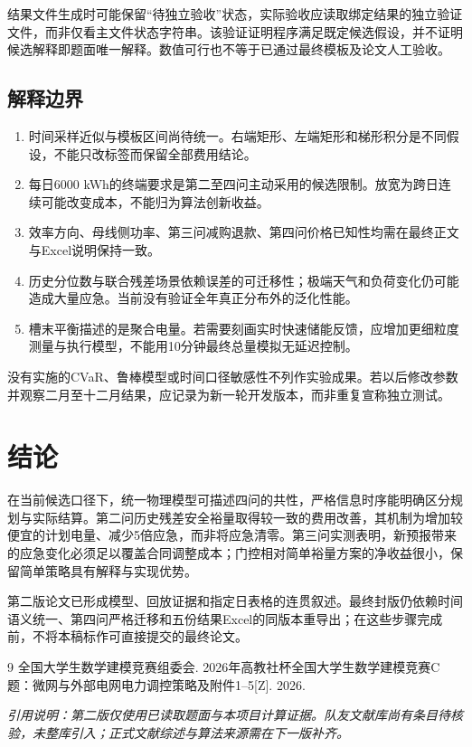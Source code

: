 \documentclass[UTF8,a4paper,zihao=-4,fontset=fandol]{ctexart}
\begin{document}
结果文件生成时可能保留“待独立验收”状态，实际验收应读取绑定结果的独立验证文件，而非仅看主文件状态字符串。该验证证明程序满足既定候选假设，并不证明候选解释即题面唯一解释。数值可行也不等于已通过最终模板及论文人工验收。

\subsection{解释边界}
\begin{enumerate}
\item 时间采样近似与模板区间尚待统一。右端矩形、左端矩形和梯形积分是不同假设，不能只改标签而保留全部费用结论。
\item 每日6000 kWh的终端要求是第二至四问主动采用的候选限制。放宽为跨日连续可能改变成本，不能归为算法创新收益。
\item 效率方向、母线侧功率、第三问减购退款、第四问价格已知性均需在最终正文与Excel说明保持一致。
\item 历史分位数与联合残差场景依赖误差的可迁移性；极端天气和负荷变化仍可能造成大量应急。当前没有验证全年真正分布外的泛化性能。
\item 槽末平衡描述的是聚合电量。若需要刻画实时快速储能反馈，应增加更细粒度测量与执行模型，不能用10分钟最终总量模拟无延迟控制。
\end{enumerate}
没有实施的CVaR、鲁棒模型或时间口径敏感性不列作实验成果。若以后修改参数并观察二月至十二月结果，应记录为新一轮开发版本，而非重复宣称独立测试。

\section{结论}
在当前候选口径下，统一物理模型可描述四问的共性，严格信息时序能明确区分规划与实际结算。第二问历史残差安全裕量取得较一致的费用改善，其机制为增加较便宜的计划电量、减少5倍应急，而非将应急清零。第三问实测表明，新预报带来的应急变化必须足以覆盖合同调整成本；门控相对简单裕量方案的净收益很小，保留简单策略具有解释与实现优势。

第二版论文已形成模型、回放证据和指定日表格的连贯叙述。最终封版仍依赖时间语义统一、第四问严格迁移和五份结果Excel的同版本重导出；在这些步骤完成前，不将本稿标作可直接提交的最终论文。

\begin{thebibliography}{9}
 全国大学生数学建模竞赛组委会. 2026年高教社杯全国大学生数学建模竞赛C题：微网与外部电网电力调控策略及附件1--5[Z]. 2026.
\end{thebibliography}
\noindent\textit{引用说明：第二版仅使用已读取题面与本项目计算证据。队友文献库尚有条目待核验，未整库引入；正式文献综述与算法来源需在下一版补齐。}
\end{document}
